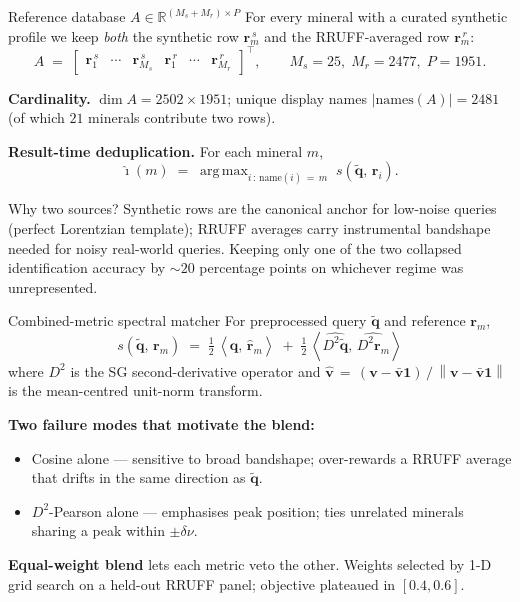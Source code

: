 \documentclass[10pt,aspectratio=169]{beamer}
\newcommand{\R}{\mathbb{R}}
\newcommand{\norm}[1]{\left\lVert #1 \right\rVert}
\newcommand{\inner}[2]{\left\langle #1,\, #2 \right\rangle}
\DeclareMathOperator*{\argmax}{arg\,max}
\begin{document}
\begin{frame}{Reference database $A \in \R^{(M_{s} + M_{r}) \times P}$}
For every mineral with a curated synthetic profile we keep
\emph{both} the synthetic row $\mathbf{r}_{m}^{\,s}$
and the RRUFF-averaged row $\mathbf{r}_{m}^{\,r}$:
\[
  A \;=\;
  \begin{bmatrix}
    \mathbf{r}_{1}^{\,s} & \cdots & \mathbf{r}_{M_{s}}^{\,s} &
    \mathbf{r}_{1}^{\,r} & \cdots & \mathbf{r}_{M_{r}}^{\,r}
  \end{bmatrix}^{\!\top},
  \qquad
  M_{s}{=}25,\; M_{r}{=}2477,\; P{=}1951.
\]
\smallskip

\textbf{Cardinality.}
\;$\dim A = 2502 \times 1951$;
\;unique display names $|\mathrm{names}(A)| = 2481$
(of which $21$ minerals contribute two rows).
\smallskip

\textbf{Result-time deduplication.} For each mineral $m$,
\[
  \hat{\imath}(m) \;=\; \argmax_{i\,:\,\text{name}(i)\,=\,m}\; s\!\left(\tilde{\mathbf{q}},\,\mathbf{r}_{i}\right).
\]
\medskip

\begin{block}{Why two sources?}
Synthetic rows are the canonical anchor for low-noise queries
(perfect Lorentzian template); RRUFF averages carry instrumental
bandshape needed for noisy real-world queries. Keeping only one of
the two collapsed identification accuracy by $\sim 20$ percentage points
on whichever regime was unrepresented.
\end{block}
\end{frame}

\begin{frame}{Combined-metric spectral matcher}
For preprocessed query $\tilde{\mathbf{q}}$ and reference $\mathbf{r}_{m}$,
\[
  \boxed{\;
  s\!\left(\tilde{\mathbf{q}},\,\mathbf{r}_{m}\right)
  \;=\;
  \tfrac{1}{2}\,\inner{\hat{\mathbf{q}}}{\hat{\mathbf{r}}_{m}}
  \;+\;
  \tfrac{1}{2}\,\inner{\widehat{D^{2}\!\tilde{\mathbf{q}}}}{\widehat{D^{2}\!\mathbf{r}_{m}}}
  \;}
\]
where $D^{2}$ is the SG second-derivative operator and
$\hat{\mathbf{v}} \,=\, (\mathbf{v} - \bar{\mathbf{v}}\bm{1})\,/\,\norm{\mathbf{v}-\bar{\mathbf{v}}\bm{1}}$
is the mean-centred unit-norm transform.
\medskip

\textbf{Two failure modes that motivate the blend:}
\begin{itemize}\setlength\itemsep{0.2em}
  \item Cosine alone --- sensitive to broad bandshape; over-rewards a RRUFF
        average that drifts in the same direction as $\tilde{\mathbf{q}}$.
  \item $D^{2}$-Pearson alone --- emphasises peak position; ties unrelated
        minerals sharing a peak within $\pm \delta\nu$.
\end{itemize}
\medskip

\textbf{Equal-weight blend} lets each metric \alert{veto} the other.
Weights selected by 1-D grid search on a held-out RRUFF panel; objective
plateaued in $[0.4, 0.6]$.
\end{frame}
\end{document}
